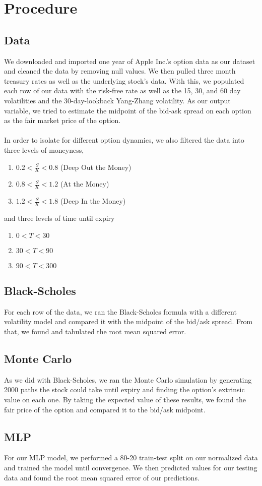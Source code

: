 \section{Procedure}
\subsection{Data}
We downloaded and imported one year of Apple Inc.'s option data as our dataset and cleaned the data by removing null values. We then pulled three month treasury rates as well as the underlying stock's data. With this, we populated each row of our data with the risk-free rate as well as the 15, 30, and 60 day volatilities and the 30-day-lookback Yang-Zhang volatility\cite{underlying}. As our output variable, we tried to estimate the midpoint of the bid-ask spread on each option as the fair market price of the option.
\\ \\
In order to isolate for different option dynamics, we also filtered the data into three levels of moneyness, 
\begin{enumerate}
    \item $0.2 < \frac{S}{K} < 0.8 $ (Deep Out the Money)
    \item $0.8 < \frac{S}{K} < 1.2 $ (At the Money)
    \item $1.2 < \frac{S}{K} < 1.8 $ (Deep In the Money)
\end{enumerate}
and three levels of time until expiry
\begin{enumerate}
    \item $0 < T < 30 $
    \item $30 < T < 90 $
    \item $90 < T < 300 $
\end{enumerate}


\subsection{Black-Scholes}
For each row of the data, we ran the Black-Scholes formula with a different volatility model and compared it with the midpoint of the bid/ask spread. From that, we found and tabulated the root mean squared error.

\subsection{Monte Carlo}
As we did with Black-Scholes, we ran the Monte Carlo simulation by generating 2000 paths the stock could take until expiry and finding the option's extrinsic value on each one. By taking the expected value of these results, we found the fair price of the option and compared it to the bid/ask midpoint. 

\subsection{MLP}
For our MLP model, we performed a 80-20 train-test split on our normalized data and trained the model until convergence. We then predicted values for our testing data and found the root mean squared error of our predictions.
